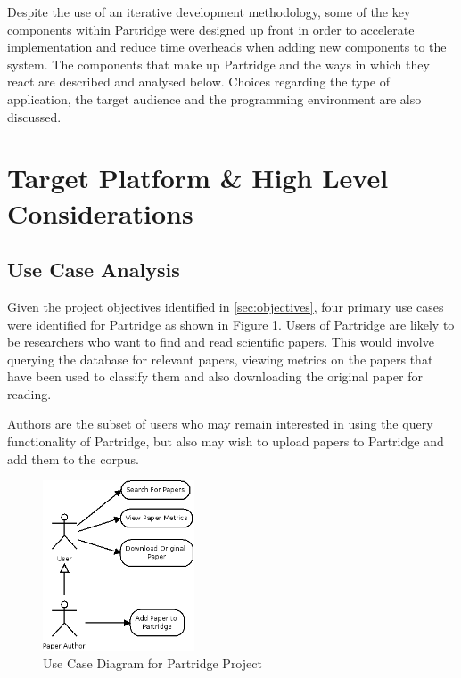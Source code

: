 %
%

Despite the use of an iterative development methodology, some of the key
components within Partridge were designed up front in order to accelerate
implementation and reduce time overheads when adding new components to the
system. The components that make up Partridge and the ways in which they react
are described and analysed below. Choices regarding the type of application,
the target audience and the programming environment are also discussed.


\section{ Target Platform \& High Level Considerations }

\subsection{Use Case Analysis}

Given the project objectives identified in \ref{sec:objectives}, four primary
use cases were identified for Partridge as shown in Figure \ref{fig:use_cases}.
Users of Partridge are likely to be researchers who want to find and read
scientific papers. This would involve querying the database for relevant
papers, viewing metrics on the papers that have been used to classify them and
also downloading the original paper for reading. 

Authors are the subset of users who may remain interested in using the query
functionality of Partridge, but also may wish to upload papers to Partridge and
add them to the corpus.

\begin{figure}[!h]
\centering
\includegraphics[width=0.4\textwidth]{images/design/use_cases.png}
\caption{Use Case Diagram for Partridge Project}
\label{fig:use_cases}
\end{figure}

